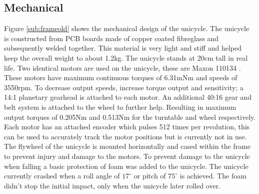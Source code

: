 \documentclass[twoside,twocolumn,12pt]{article}
\begin{document}
\subsection{Mechanical}
Figure \ref{sub:frameold} shows the mechanical design of the unicycle. The unicycle is constructed from PCB boards made of copper coated fibreglass and subsequently welded together. This material is very light and stiff and helped keep the overall weight to about 1.2kg. The unicycle stands at 20cm tall in real life.
\newline
Two identical motors are used on the unicycle, these are Maxon 110134 \cite{motor}. These motors have maximum continuous torques of 6.31mNm and speeds of 3550rpm. To decrease output speeds, increase torque output and sensitivity; a 14:1 planetary gearhead \cite{gear} is attached to each motor. An additional 40:16 gear and belt system is attached to the wheel to further help. Resulting in maximum output torques of 0.205Nm and 0.513Nm for the turntable and wheel respectively. Each motor has an attached encoder which pulses 512 times per revolution, this can be used to accurately track the motor positions but is currently not in use.
\newline
The flywheel of the unicycle is mounted horizontally and cased within the frame to prevent injury and damage to the motors.
\newline
To prevent damage to the unicycle when falling a basic protection of foam was added to the unicycle. The unicycle currently crashed when a roll angle of $17^{\circ}$ or pitch of $75^{\circ}$ is achieved. The foam didn't stop the initial impact, only when the unicycle later rolled over. 
\end{document}
